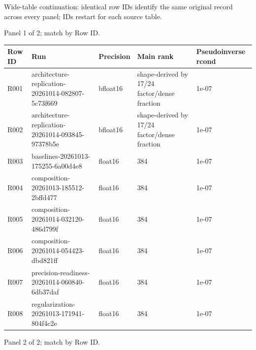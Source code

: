 \documentclass[10pt]{article}
\begin{document}
Wide-table continuation: identical row IDs identify the same original record across every panel; IDs restart for each source table.
\par\noindent Panel 1 of 2; match by Row ID.
{\scriptsize\setlength{\tabcolsep}{2pt}
\begin{longtable}{p{}p{}p{}p{}p{}}
Row ID & Run & Precision & Main rank & Pseudoinverse rcond \\
\hline\endhead
R001 & architecture-replication-20261014-082807-5c73f669 & bfloat16 & shape-derived by 17/24 factor/dense fraction & 1e-07 \\
R002 & architecture-replication-20261014-093845-97378b5e & bfloat16 & shape-derived by 17/24 factor/dense fraction & 1e-07 \\
R003 & baselines-20261013-175255-6a00d4e8 & float16 & 384 & 1e-07 \\
R004 & composition-20261013-185512-2bffd477 & float16 & 384 & 1e-07 \\
R005 & composition-20261014-032120-486d799f & float16 & 384 & 1e-07 \\
R006 & composition-20261014-054423-dbd821ff & float16 & 384 & 1e-07 \\
R007 & precision-readiness-20261014-060840-6db37daf & float16 & 384 & 1e-07 \\
R008 & regularization-20261013-171941-804f4c2e & float16 & 384 & 1e-07 \\
\end{longtable}}
\par\noindent Panel 2 of 2; match by Row ID.
\end{document}
